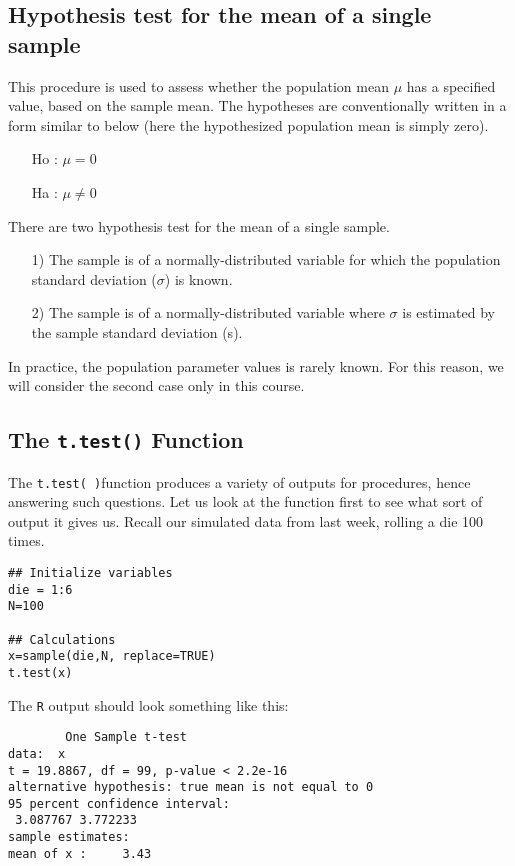 \subsection{Hypothesis test for the mean of a single sample }

This procedure is used to assess whether the population mean $\mu$  has a specified value, based on the sample mean. The hypotheses are conventionally written in a form similar to below (here the hypothesized population mean is simply zero).

       \begin{itemize}
       \item[Ho] : $\mu = 0$
       \item[Ha] : $\mu \neq 0$
       \end{itemize}

There are two hypothesis test for the mean of a single sample.

\begin{itemize}
 \item [1)] The sample is of a normally-distributed variable for which the population standard deviation ($\sigma$) is known.
 \item [2)] The sample is of a normally-distributed variable where $\sigma$ is estimated by the sample standard deviation (s).
\end{itemize}
In practice, the population parameter values is rarely known. For this reason, we will consider the second case only in this course.

\subsection{The \texttt{t.test()} Function}
The \texttt{t.test( )}function produces a variety of  outputs for procedures, hence answering such questions. Let us look at the function first to see what sort of output it gives us.
Recall our simulated data from last week, rolling a die 100 times.

\begin{framed}
\begin{verbatim}
## Initialize variables
die = 1:6
N=100

## Calculations
x=sample(die,N, replace=TRUE)
t.test(x)
\end{verbatim}
\end{framed}
The \texttt{R} output should look something like this:
\begin{verbatim}
        One Sample t-test
data:  x
t = 19.8867, df = 99, p-value < 2.2e-16
alternative hypothesis: true mean is not equal to 0
95 percent confidence interval:
 3.087767 3.772233
sample estimates:
mean of x :     3.43
\end{verbatim}

